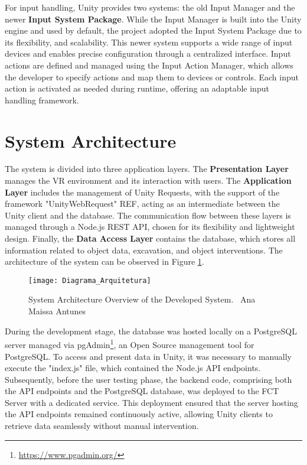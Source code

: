 For input handling, Unity provides two systems: the old Input Manager and the newer \textbf{Input System Package}. 
While the Input Manager is built into the Unity engine and used by default, the project adopted the Input System Package due to its flexibility, and scalability. 
This newer system supports a wide range of input devices and enables precise configuration through a centralized interface. Input actions are defined and managed using the Input Action Manager, which allows the developer to specify actions and map them to devices or controls. 
Each input action is activated as needed during runtime, offering an adaptable input handling framework.


\section{System Architecture}
\label{sec:architecture}

The system is divided into three application layers.
The \textbf{Presentation Layer} manages the \gls{VR} environment and its interaction with users. The \textbf{Application Layer} includes the management of Unity Requests, with the support of the framework "UnityWebRequest" REF, acting as an intermediate between the Unity client and the database. 
The communication flow between these layers is managed through a Node.js REST API, chosen for its flexibility and lightweight design. 
Finally, the \textbf{Data Access Layer} contains the database, which stores all information related to object data, excavation, and object interventions. 
The architecture of the system can be observed in Figure \ref{fig:architecture}.
\begin{figure}[h!]
    \centering
    \texttt{[image: Diagrama\_Arquitetura]}
    \caption{System Architecture Overview of the Developed System. \textcopyright\ Ana Maissa Antunes}
    \label{fig:architecture}
\end{figure}

During the development stage, the database was hosted locally on a PostgreSQL server managed via pgAdmin\footnote{\url{https://www.pgadmin.org/}}, an Open Source management tool for PostgreSQL. To access and present data in Unity, it was necessary to manually execute the "index.js" file, which contained the Node.js API endpoints.
Subsequently, before the user testing phase, the backend code, comprising both the API endpoints and the PostgreSQL database, was deployed to the \gls{FCT} Server with a dedicated service.
This deployment ensured that the server hosting the API endpoints remained continuously active, allowing Unity clients to retrieve data seamlessly without manual intervention.

